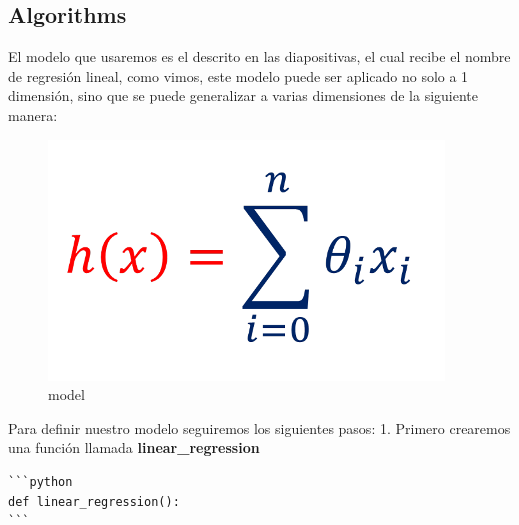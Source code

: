 \documentclass[11pt]{article}
\makeatletter
\def\maxwidth{\ifdim\Gin@nat@width>\linewidth\linewidth
    \else\Gin@nat@width\fi}
\let\Oldincludegraphics\includegraphics
\renewcommand{\includegraphics}[1]{\Oldincludegraphics[width=.8\maxwidth]{#1}}
\makeatother
\begin{document}
    \subsection{Algorithms}\label{algorithms}

    El modelo que usaremos es el descrito en las diapositivas, el cual
recibe el nombre de regresión lineal, como vimos, este modelo puede ser
aplicado no solo a 1 dimensión, sino que se puede generalizar a varias
dimensiones de la siguiente manera:

    \begin{figure}
\centering
\includegraphics{./images/model.png}
\caption{model}
\end{figure}

    Para definir nuestro modelo seguiremos los siguientes pasos: 1. Primero
crearemos una función llamada \textbf{linear\_regression}

\begin{verbatim}
```python
def linear_regression():
```
\end{verbatim}
\end{document}

